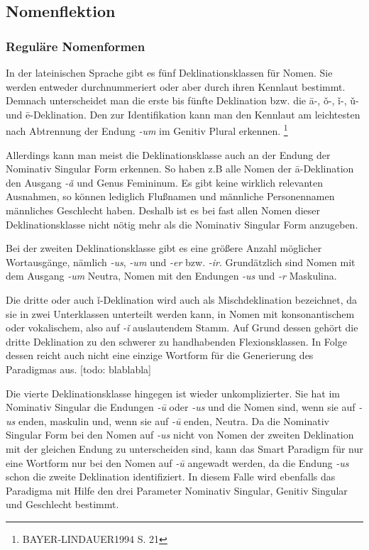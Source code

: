 \documentclass[12pt,abstract=on,titlepage,bibliography=totoc,ngerman,listof=totoc]{scrreprt}
\begin{document}
\subsection{Nomenflektion}
\label{subsec:nomen}
\subsubsection{Reguläre Nomenformen}
In der lateinischen Sprache gibt es fünf Deklinationsklassen für Nomen. Sie werden entweder durchnummeriert oder aber durch ihren Kennlaut bestimmt. Demnach unterscheidet man die erste bis fünfte Deklination bzw. die ā-, ǒ-, ǐ-, ǔ- und ē-Deklination. Den zur Identifikation kann man den Kennlaut am leichtesten nach Abtrennung der Endung \textit{-um} im Genitiv Plural erkennen. \footnote{BAYER-LINDAUER1994 S. 21}\par
Allerdings kann man meist die Deklinationsklasse auch an der Endung der Nominativ Singular Form erkennen. So haben z.B alle Nomen der ā-Deklination den Ausgang \textit{-ǎ} und Genus Femininum. Es gibt keine wirklich relevanten Ausnahmen, so können lediglich Flußnamen und männliche Personennamen männliches Geschlecht haben. Deshalb ist es bei fast allen Nomen dieser Deklinationsklasse nicht nötig mehr als die Nominativ Singular Form anzugeben. \par
Bei der zweiten Deklinationsklasse gibt es eine größere Anzahl möglicher Wortausgänge, nämlich \textit{-us}, \textit{-um} und \textit{-er} bzw. \textit{-ir}. Grundätzlich sind Nomen mit dem Ausgang \textit{-um} Neutra, Nomen mit den Endungen \textit{-us} und \textit{-r} Maskulina. \par
Die dritte oder auch ǐ-Deklination wird auch als Mischdeklination bezeichnet, da sie in zwei Unterklassen unterteilt werden kann, in Nomen mit konsonantischem oder vokalischem, also auf \textit{-ǐ} auslautendem Stamm. Auf Grund dessen gehört die dritte Deklination zu den schwerer zu handhabenden Flexionsklassen. In Folge dessen reicht auch nicht eine einzige Wortform für die Generierung des Paradigmas aus. [todo: blablabla] \par
Die vierte Deklinationsklasse hingegen ist wieder unkomplizierter. Sie hat im Nominativ Singular die Endungen \textit{-ū} oder \textit{-us} und die Nomen sind, wenn sie auf \textit{-us} enden, maskulin und, wenn sie auf \textit{-ū} enden, Neutra. Da die Nominativ Singular Form bei den Nomen auf \textit{-us} nicht von Nomen der zweiten Deklination mit der gleichen Endung zu unterscheiden sind, kann das Smart Paradigm für nur eine Wortform nur bei den Nomen auf \textit{-ū} angewadt werden, da die Endung \textit{-us} schon die zweite Deklination identifiziert. In diesem Falle wird ebenfalls das Paradigma mit Hilfe den drei Parameter Nominativ Singular, Genitiv Singular und Geschlecht bestimmt. \par
\end{document}
